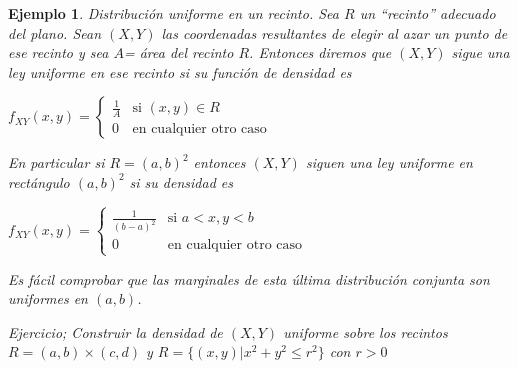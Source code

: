 \documentclass[12pt]{report}
\newtheorem{example}[definition]{Ejemplo}
\begin{document}
\begin{example}
              Distribución uniforme en un recinto. Sea $R$ un ``recinto''
              adecuado del plano. Sean $(X,Y)$ las coordenadas resultantes de elegir al
              azar un punto de ese recinto y sea $A$= área del recinto $R$.
              Entonces diremos que $(X,Y)$ sigue una ley uniforme en ese
              recinto si su función de densidad es

              $f_{XY}(x,y)=\left\{
                            \begin{array}{ll}
                  \frac{1}{A} & \mbox{si } (x,y)\in R  \\
                 0 & \mbox{en cualquier otro caso}
              \end{array}\right.$

              En particular si $R=(a,b)^2$ entonces $(X,Y)$ siguen una ley
              uniforme en rectángulo $(a,b)^2$ si su densidad
              es

              $f_{XY}(x,y)=\left\{
                            \begin{array}{ll}
                  \frac{1}{(b-a)^2} & \mbox{si } a< x,y< b\\
                 0 & \mbox{en cualquier otro caso}
              \end{array}\right.$


              Es fácil comprobar que las marginales de esta última
              distribución conjunta son uniformes en $(a,b)$.

              Ejercicio; Construir la densidad de $(X,Y)$  
              uniforme sobre los recintos $R=(a,b)\times(c,d)$ y $R=\{(x,y)|
              x^2+y^2\leq r^2\}$ con $r>0$
             \end{example}
\end{document}
